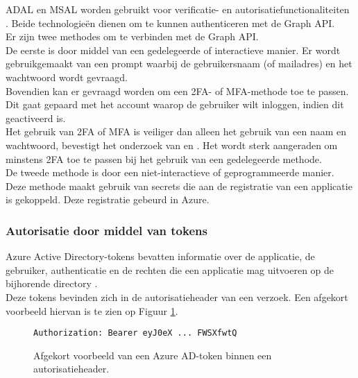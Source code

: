 \ac{ADAL} en \ac{MSAL} worden gebruikt voor verificatie- en autorisatiefunctionaliteiten \autocite{Ooms2022}. Beide technologieën dienen om te kunnen authenticeren met de Graph \ac{API}. \\ 

Er zijn twee methodes om te verbinden met de Graph \ac{API}. \\

De eerste is door middel van een gedelegeerde of interactieve manier. Er wordt gebruikgemaakt van een prompt waarbij de gebruikersnaam (of mailadres) en het wachtwoord wordt gevraagd. \\

Bovendien kan er gevraagd worden om een \ac{2FA}- of \ac{MFA}-methode toe te passen. Dit gaat gepaard met het account waarop de gebruiker wilt inloggen, indien dit geactiveerd is. \\

Het gebruik van \ac{2FA} of \ac{MFA} is veiliger dan alleen het gebruik van een naam en wachtwoord, bevestigt het onderzoek van \textcite{Gunson2011} en \textcite{Banyal2013}. Het wordt sterk aangeraden om minstens \ac{2FA} toe te passen bij het gebruik van een gedelegeerde methode. \\

De tweede methode is door een niet-interactieve of geprogrammeerde manier. Deze methode maakt gebruik van secrets die aan de registratie van een applicatie is gekoppeld. Deze registratie gebeurd in Azure. 



\subsubsection{Autorisatie door middel van tokens}

Azure Active Directory-tokens bevatten informatie over de applicatie, de gebruiker, authenticatie en de rechten die een applicatie mag uitvoeren op de bijhorende directory \autocite{Microsoft2015}. \\

Deze tokens bevinden zich in de autorisatieheader van een verzoek. Een afgekort voorbeeld hiervan is te zien op Figuur \ref{ahtoken}. \\

\begin{figure}[h]
    \scriptsize
    \begin{verbatim}
Authorization: Bearer eyJ0eX ... FWSXfwtQ
    \end{verbatim}    
    \caption[Voorbeeld Azure AD-token]{Afgekort voorbeeld van een Azure \Ac{AD}-token binnen een autorisatieheader.}
    \label{ahtoken}
\end{figure}

